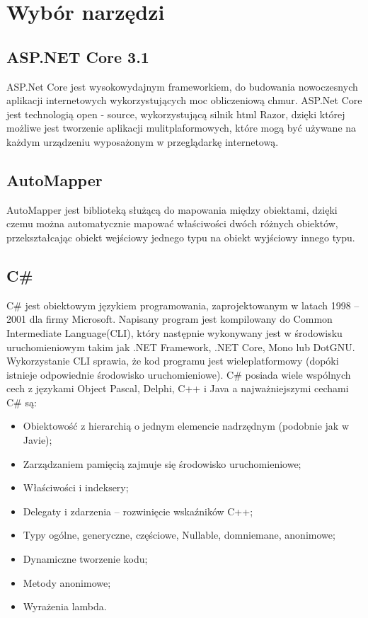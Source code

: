 \documentclass[12pt,a4paper]{article}
\begin{document}
	\newpage
	
	\section{Wybór narzędzi}
		\subsection{ASP.NET Core 3.1}
			\indent ASP.Net Core jest wysokowydajnym frameworkiem, do budowania nowoczesnych aplikacji internetowych wykorzystujących moc obliczeniową chmur. ASP.Net Core jest technologią
			open - source, wykorzystującą silnik html Razor, dzięki której możliwe jest tworzenie aplikacji mulitplaformowych, które mogą być używane na każdym urządzeniu wyposażonym
			w przeglądarkę internetową.

		\subsection{AutoMapper}
			\indent AutoMapper jest biblioteką służącą do mapowania między obiektami, dzięki czemu można automatycznie mapować właściwości dwóch różnych obiektów,
					przekształcając obiekt wejściowy jednego typu na obiekt wyjściowy innego typu.  
		\subsection{C\#}
			\indent C\# jest obiektowym językiem programowania, zaprojektowanym w latach 1998 – 2001 dla firmy Microsoft.
			Napisany program jest kompilowany do Common Intermediate Language(CLI), który następnie wykonywany jest w środowisku uruchomieniowym takim jak .NET Framework,
			.NET Core, Mono lub DotGNU.
			Wykorzystanie CLI sprawia, że kod programu jest wieleplatformowy (dopóki istnieje odpowiednie środowisko uruchomieniowe).
			C\# posiada wiele wspólnych cech z językami Object Pascal, Delphi, C++ i Java a najważniejszymi cechami C\# są:
			\begin{itemize}
				\item Obiektowość z hierarchią o jednym elemencie nadrzędnym (podobnie jak w Javie);
				\item Zarządzaniem pamięcią zajmuje się środowisko uruchomieniowe;
				\item Właściwości i indeksery;
				\item Delegaty i zdarzenia – rozwinięcie wskaźników C++;
				\item Typy ogólne, generyczne, częściowe, Nullable, domniemane, anonimowe;
				\item Dynamiczne tworzenie kodu;
				\item Metody anonimowe;
				\item Wyrażenia lambda.
			\end{itemize}
		
\end{document}
